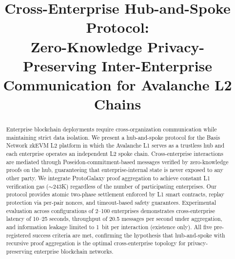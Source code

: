 \documentclass[conference]{IEEEtran}
\begin{document}

\title{Cross-Enterprise Hub-and-Spoke Protocol:\\
Zero-Knowledge Privacy-Preserving Inter-Enterprise\\
Communication for Avalanche L2 Chains}

\author{
}

\maketitle


\begin{abstract}
Enterprise blockchain deployments require cross-organization communication
while maintaining strict data isolation. We present a hub-and-spoke protocol
for the Basis Network zkEVM L2 platform in which the Avalanche L1 serves as a
trustless hub and each enterprise operates an independent L2 spoke chain.
Cross-enterprise interactions are mediated through Poseidon-commitment-based
messages verified by zero-knowledge proofs on the hub, guaranteeing that
enterprise-internal state is never exposed to any other party. We integrate
ProtoGalaxy proof aggregation to achieve constant L1 verification gas
($\sim$243K) regardless of the number of participating enterprises. Our
protocol provides atomic two-phase settlement enforced by L1 smart contracts,
replay protection via per-pair nonces, and timeout-based safety guarantees.
Experimental evaluation across configurations of 2--100 enterprises
demonstrates cross-enterprise latency of 10--25 seconds, throughput of 20.5
messages per second under aggregation, and information leakage limited to
1~bit per interaction (existence only). All five pre-registered success
criteria are met, confirming the hypothesis that hub-and-spoke with recursive
proof aggregation is the optimal cross-enterprise topology for
privacy-preserving enterprise blockchain networks.
\end{abstract}
\end{document}
